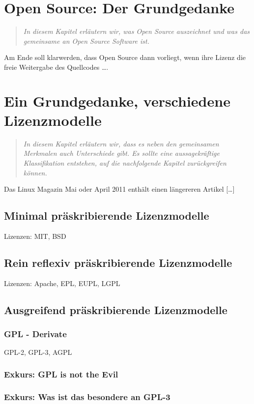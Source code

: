 \documentclass[DIV=calc,BCOR=5mm,11pt,headings=small,oneside,toc=bib]{scrbook}
\begin{document}
\chapter{Open Source: Der Grundgedanke}
\begin{quote}\itshape
In diesem Kapitel erläutern wir, was Open Source auszeichnet und was das
gemeinsame an Open Source Software ist.
\end{quote} 

Am Ende soll klarwerden, dass Open Source dann vorliegt, wenn ihre Lizenz die
freie Weitergabe des Quellcodes \ldots.

\chapter{Ein Grundgedanke, verschiedene Lizenzmodelle}
\begin{quote}\itshape
In diesem Kapitel erläutern wir, dass es neben den gemeinsamen Merkmalen auch
Unterschiede gibt. Es sollte eine aussagekräftige Klassifikation entstehen, auf
die nachfolgende Kapitel zurückgreifen können.
\end{quote}
Das Linux Magazin Mai oder April 2011 enthält einen längereren Artikel [\ldots]

\section{Minimal präskribierende Lizenzmodelle}
Lizenzen: MIT, BSD

\section{Rein reflexiv präskribierende Lizenzmodelle}
Lizenzen: Apache, EPL, EUPL, LGPL

\section{Ausgreifend präskribierende Lizenzmodelle}

\subsection{GPL - Derivate}
GPL-2, GPL-3, AGPL

\subsection{Exkurs: GPL is not the Evil}

\subsection{Exkurs: Was ist das besondere an GPL-3}
\end{document}
